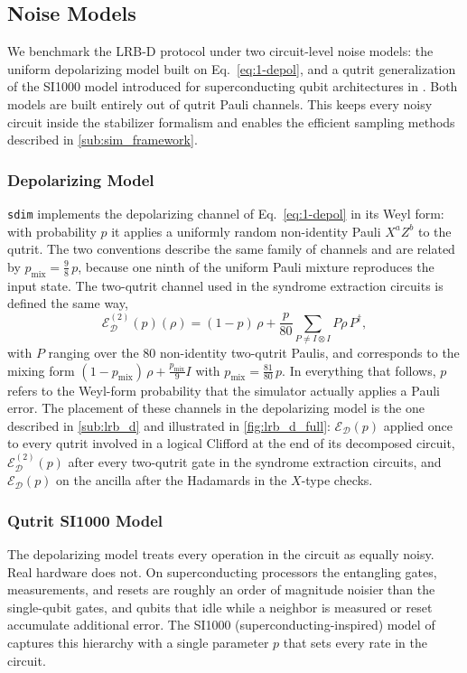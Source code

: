 \subsection{Noise Models}
\label{sub:noise_models}

We benchmark the LRB-D protocol under two circuit-level noise models: the uniform depolarizing model built on Eq.~\eqref{eq:1-depol}, and a qutrit generalization of the SI1000 model introduced for superconducting qubit architectures in \cite{GidneyHoneycomb2021}. Both models are built entirely out of qutrit Pauli channels. This keeps every noisy circuit inside the stabilizer formalism and enables the efficient sampling methods described in \autoref{sub:sim_framework}.

\subsubsection{Depolarizing Model}
\label{subsub:depol_model}
\texttt{sdim} implements the depolarizing channel of Eq.~\eqref{eq:1-depol} in its Weyl form: with probability $p$ it applies a uniformly random non-identity Pauli $X^a Z^b$ to the qutrit. The two conventions describe the same family of channels and are related by $p_{\mathrm{mix}} = \tfrac{9}{8}\,p$, because one ninth of the uniform Pauli mixture reproduces the input state. The two-qutrit channel used in the syndrome extraction circuits is defined the same way,
\begin{equation}
    \mathcal{E}^{(2)}_{\mathcal{D}}(p)(\rho) = (1-p)\,\rho + \frac{p}{80}\sum_{P \neq I \otimes I} P \rho\, P^\dagger,
    \label{eq:2-depol}
\end{equation}
with $P$ ranging over the $80$ non-identity two-qutrit Paulis, and corresponds to the mixing form $(1-p_{\mathrm{mix}})\,\rho + \tfrac{p_{\mathrm{mix}}}{9} I$ with $p_{\mathrm{mix}} = \tfrac{81}{80}\,p$. In everything that follows, $p$ refers to the Weyl-form probability that the simulator actually applies a Pauli error. The placement of these channels in the depolarizing model is the one described in \autoref{sub:lrb_d} and illustrated in \autoref{fig:lrb_d_full}: $\mathcal{E}_{\mathcal{D}}(p)$ applied once to every qutrit involved in a logical Clifford at the end of its decomposed circuit, $\mathcal{E}^{(2)}_{\mathcal{D}}(p)$ after every two-qutrit gate in the syndrome extraction circuits, and $\mathcal{E}_{\mathcal{D}}(p)$ on the ancilla after the Hadamards in the $X$-type checks.

\subsubsection{Qutrit SI1000 Model}
\label{subsub:si1000_model}
The depolarizing model treats every operation in the circuit as equally noisy. Real hardware does not. On superconducting processors the entangling gates, measurements, and resets are roughly an order of magnitude noisier than the single-qubit gates, and qubits that idle while a neighbor is measured or reset accumulate additional error. The SI1000 (superconducting-inspired) model of \cite{GidneyHoneycomb2021} captures this hierarchy with a single parameter $p$ that sets every rate in the circuit.

